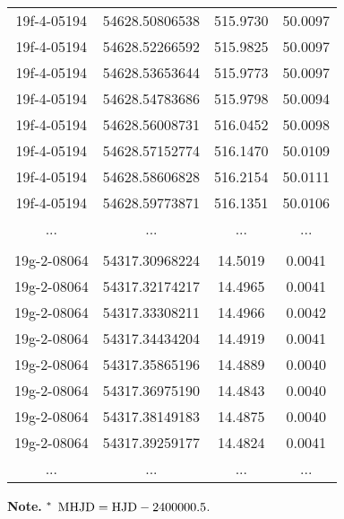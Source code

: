 \documentclass[fleqn,usenatbib]{mnras}
\begin{document}
\begin{table}
\begin{center}
\begin{tabular}{cccc}
19f-4-05194 & 54628.50806538 & 515.9730 & 50.0097 \\
19f-4-05194 & 54628.52266592 & 515.9825 & 50.0097 \\
19f-4-05194 & 54628.53653644 & 515.9773 & 50.0097 \\
19f-4-05194 & 54628.54783686 & 515.9798 & 50.0094 \\
19f-4-05194 & 54628.56008731 & 516.0452 & 50.0098 \\
19f-4-05194 & 54628.57152774 & 516.1470 & 50.0109 \\
19f-4-05194 & 54628.58606828 & 516.2154 & 50.0111 \\
19f-4-05194 & 54628.59773871 & 516.1351 & 50.0106 \\
... & ... & ... & ... \\
\\  [-1ex]

19g-2-08064 & 54317.30968224 & 14.5019 & 0.0041 \\
19g-2-08064 & 54317.32174217 & 14.4965 & 0.0041 \\
19g-2-08064 & 54317.33308211 & 14.4966 & 0.0042 \\
19g-2-08064 & 54317.34434204 & 14.4919 & 0.0041 \\
19g-2-08064 & 54317.35865196 & 14.4889 & 0.0040 \\
19g-2-08064 & 54317.36975190 & 14.4843 & 0.0040 \\
19g-2-08064 & 54317.38149183 & 14.4875 & 0.0040 \\
19g-2-08064 & 54317.39259177 & 14.4824 & 0.0041 \\
... & ... & ... & ... \\


\hline %
\end{tabular}
\begin{list}{}{}
\item[]{\scriptsize{ {\bf Note.} $^{\rm *}$ ${\rm MHJD}={\rm HJD}-2400000.5$.}}
\end{list}
\end{center}
\end{table}
\end{document}
